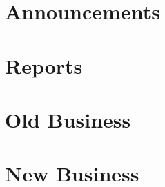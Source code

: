 \documentclass[11pt,hacksoc]{meetingmins}
\begin{document}
\maketitle

\section{Announcements}
\begin{items}
\item

\end{items}

\section{Reports}

\subsection{}
\begin{hiddensubitems}
\item
\end{hiddensubitems}

\section{Old Business}
\begin{items}
\item
\end{items}

\section{New Business}
\begin{items}
\item
\end{items}

\vspace{1em}
\nextmeeting{}
\end{document}
